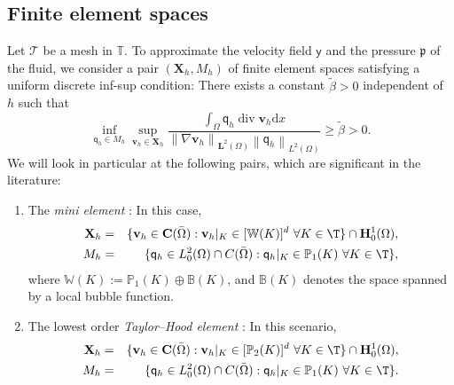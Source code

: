 \documentclass[final]{siamart0216}
\begin{document}
\subsection{Finite element spaces}
Let $\mathscr{T}$ be a mesh in $\mathbb{T}$. To approximate the velocity field $\boldsymbol{\mathsf{y}}$ and the pressure $\mathfrak{p}$ of the fluid, we consider a pair $(\mathbf{X}_h,M_h)$ of finite element spaces satisfying a uniform discrete inf-sup condition: There exists a constant $\tilde{\beta}>0$ independent of $h$ such that
\begin{equation}\label{eq:discrete_infsup}
\inf _{\mathsf{q}_h \in M_h} \sup _{\mathbf{v}_h \in \mathbf{X}_h} \frac{ \int_{\Omega} \mathsf{q}_h\operatorname{div} \mathbf{v}_h \mathrm{d}x }{\left\|\nabla\mathbf{v}_h\right\|_{\mathbf{L}^2(\Omega)}\left\|\mathsf{q}_h\right\|_{L^2(\Omega)}} \geqslant \tilde{\beta}>0.
\end{equation}
We will look in particular at the following pairs, which are significant in the literature:

\begin{enumerate}
\item[(a)] The \emph{mini element} \cite[Section 4.2.4]{Guermond-Ern}: In this case,
\begin{eqnarray}\label{ME:vel_space}
\mathbf{X}_h&=&\{\mathbf{v}_{h}\in\mathbf{C}(\bar{\Omega}): \mathbf{v}_{h}|_{K}\in[\mathbb{W}(K)]^{d} \,\,\forall K\in\T \} \cap \mathbf{H}_0^1(\Omega),
\\ 
\label{ME:press_space}
M_h&=&\{\mathsf{q}_{h}\in L_0^2(\Omega)\cap C(\bar{\Omega}): \mathsf{q}_{h}|_{K}\in\mathbb{P}_1(K) \,\,\forall K\in\T \},
\end{eqnarray}
where $\mathbb{W}(K):=\mathbb{P}_1(K)\oplus \mathbb{B}(K)$, and $\mathbb{B}(K)$ denotes the space spanned by a local bubble function.

\item[(b)] The lowest order \emph{Taylor--Hood element} \cite[Section 4.2.5]{Guermond-Ern}: In this scenario,
\begin{eqnarray}\label{TH:vel_space}
\mathbf{X}_h
&=&
\{\mathbf{v}_{h}\in\mathbf{C}(\bar{\Omega}): \mathbf{v}_{h}|_{K}\in[\mathbb{P}_2(K)]^{d} \,\,\forall K\in\T \} \cap \mathbf{H}_0^1(\Omega),\\ \label{TH:press_space}
M_h
&=&
\{\mathsf{q}_{h}\in L_0^2(\Omega)\cap C(\bar{\Omega}): \mathsf{q}_{h}|_{K}\in\mathbb{P}_1(K) \,\,\forall K\in\T \}.
\end{eqnarray}
\end{enumerate}
\end{document}
